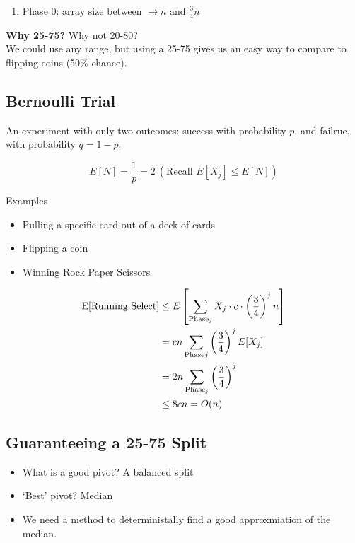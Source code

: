 \documentclass{article}
\newcommand{\runtimeselect}{\sum_{\text{Phase}_j}X_j \cdot c \cdot \left( \frac{3}{4} \right) ^ j n}
\begin{document}
\begin{enumerate}
    \item Phase 0: array size between \(\rightarrow n \text{ and } \frac{3}{4}n\)
\end{enumerate}

\textbf{Why 25-75?} Why not 20-80? \\
We could use any range, but using a 25-75 gives us an easy way to compare to flipping coins (50\% chance).

\subsection*{Bernoulli Trial}
An experiment with only two outcomes: success with probability $p$, and failrue, with probability \(q = 1 - p\).

\begin{equation*}
    E[N] = \frac{1}{p} = 2\ (\text{Recall } E[X_j] \leq E[N])
\end{equation*}

Examples
\begin{itemize}
    \item Pulling a specific card out of a deck of cards
    \item Flipping a coin
    \item Winning Rock Paper Scissors
\end{itemize}

\begin{align*}
    \text{E[\text{Running Select}]} & \leq E \left[ \runtimeselect \right]                          \\
                                    & = cn \sum_{\text{Phase} j} \left( \frac{3}{4}\right)^j E[X_j] \\
                                    & = 2n \sum_{\text{Phase}_j} \left( \frac{3}{4}\right)^j        \\
                                    & \leq 8cn = O(n)
\end{align*}

\subsection*{Guaranteeing a 25-75 Split}
\begin{itemize}
    \item What is a good pivot? A balanced split
    \item `Best' pivot? Median
    \item We need a method to deterministally find a good approxmiation of the median.
\end{itemize}
\end{document}
